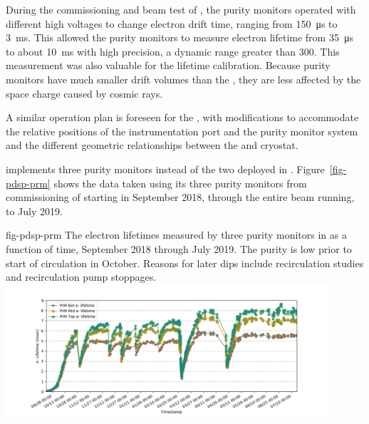 During the commissioning and beam test of , the purity monitors operated with different high voltages to change electron drift time, ranging from \SI{150}{\micro\second} to \SI{3}{\milli\second}. This allowed the  purity monitors to measure electron lifetime from \SI{35}{\micro\second} to about \SI{10}{\milli\second} with high precision, a dynamic range greater than \num{300}. 
This measurement was also valuable for the  lifetime calibration. Because purity monitors have much smaller drift volumes than the , they are less affected by the space charge caused by cosmic rays. 

  A similar 
  operation plan is foreseen for %
  the , with modifications to accommodate the relative positions of the instrumentation port %
  and the purity monitor system and the %
  different geometric relationships between the  and cryostat.





 implements three purity monitors instead of the two deployed in .
Figure~\ref{fig-pdsp-prm} shows the  data taken using %
its three purity monitors from commissioning of  starting in September 2018, through the entire beam running, to July 2019.

\begin{dunefigure}{fig-pdsp-prm}
  {The electron lifetimes measured by three purity monitors in  as a function of time, September 2018 through July 2019. The purity is low prior to start of circulation in October. Reasons for later dips include recirculation studies and recirculation pump stoppages.}
  \includegraphics[width=0.9\textwidth]{graphics/cisc_pdsp_Lifetime_till_July17_without_error}
\end{dunefigure}

